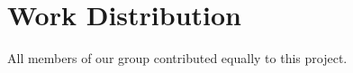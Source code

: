 \documentclass{vldb}
\begin{document}

\section{Work Distribution}

All members of our group contributed equally to this project.


\newcommand{\newblock}{}

\newpage
\balance




\appendix
\onecolumn
\end{document}
